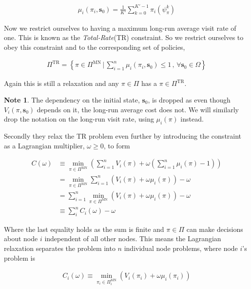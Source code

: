 \documentclass[a4paper,10pt]{article}
\theoremstyle{definition}
\theoremstyle{definition}
\theoremstyle{remark}
\theoremstyle{definition}
\newtheorem*{note}{Note}
\begin{document}
\begin{align*}
\mu_{i}(\pi_{i},\bm{s}_{0})=\frac{1}{K'} \sum\limits_{k=0}^{K'-1} \pi_{i}(\psi^{k}_{\pi})
\end{align*}

Now we restrict ourselves to having a maximum long-run average visit rate of one. This is known as the \textit{Total-Rate}(TR) constraint. So we restrict ourselves to obey this constraint and to the corresponding set of policies,

\begin{align*}
\Pi^{\text{TR}}=\left\{ \pi \in \Pi^{\text{MN}} \, \bigg| \, \sum\limits_{i=1}^{n} \mu_{i}(\pi_{i},\bm{s}_{0}) \leq 1 \, , \, \forall \bm{s}_{0} \in \Omega \right\}
\end{align*}

Again this is still a relaxation and any $\pi \in \Pi$ has a $\pi \in \Pi^{\text{TR}}$.

\begin{note}
The dependency on the initial state, $\bm{s}_{0}$, is dropped as even though $V_{i}(\pi,\bm{s}_{0})$ depends on it, the long-run average cost does not. We will similarly drop the notation on the long-run visit rate, using $\mu_{i}(\pi)$ instead.
\end{note}

Secondly they relax the TR problem even further by introducing the constraint as a Lagrangian multiplier, $\omega \geq 0$, to form

\begin{align*}
C(\omega) & \equiv \min\limits_{\pi \in \Pi^{\text{MN}}} \left(\sum\limits_{i=1}^{n} V_{i}(\pi) + \omega \left(\sum\limits_{i=1}^{n} \mu_{i}(\pi) -1\right) \right) \\
&= \min\limits_{\pi \in \Pi^{\text{MN}}} \sum\limits_{i=1}^{n} \left(V_{i}(\pi) + \omega \mu_{i}(\pi)\right)  -\omega \\
& = \sum\limits_{i=1}^{n} \min\limits_{\pi \in \Pi^{\text{MN}}} (V_{i}(\pi) +\omega\mu_{i}(\pi)) -\omega \\
& \equiv \sum\limits_{i}^{n} C_{i}(\omega) -\omega
\end{align*}

Where the last equality holds as the sum is finite and $\pi \in \Pi$ can make decisions about node $i$ independent of all other nodes. This means the Lagrangian relaxation separates the problem into $n$ individual node problems, where node $i$'s problem is

\begin{align*}
C_{i}(\omega) \equiv \min\limits_{\pi_{i} \in \Pi^{\text{MN}}_{i}} \left(V_{i}(\pi_{i}) + \omega \mu_{i}(\pi_{i})\right)
\end{align*}
\end{document}
